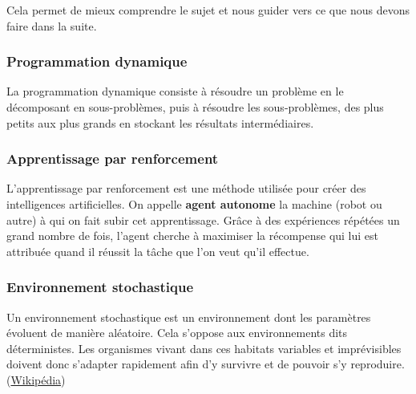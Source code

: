 Cela permet de mieux comprendre le sujet et nous guider vers ce que nous devons faire dans la suite.


\subsubsection{Programmation dynamique}
 La programmation dynamique consiste à résoudre un problème en le décomposant en sous-problèmes, puis à résoudre les sous-problèmes, des plus petits aux plus grands en stockant les résultats intermédiaires.
 
\subsubsection{Apprentissage par renforcement}

L'apprentissage par renforcement est une méthode utilisée pour créer des intelligences artificielles. On appelle \textbf{agent autonome} la machine (robot ou autre) à qui on fait subir cet apprentissage. Grâce à des expériences répétées un grand nombre de fois, l'agent cherche à maximiser la récompense qui lui est attribuée quand il réussit la tâche que l'on veut qu'il effectue.

\subsubsection{Environnement stochastique}
Un environnement stochastique est un environnement dont les paramètres évoluent de manière aléatoire. Cela s’oppose aux environnements dits déterministes. Les organismes vivant dans ces habitats variables et imprévisibles doivent donc s’adapter rapidement afin d’y survivre et de pouvoir s’y reproduire. (\href{https://fr.wikiversity.org/wiki/Adaptations_aux_environnements_stochastiques#:~:text=Un\%20environnement\%20stochastique\%20est\%20un,de\%20pouvoir\%20s'y\%20reproduire.}{Wikipédia})

